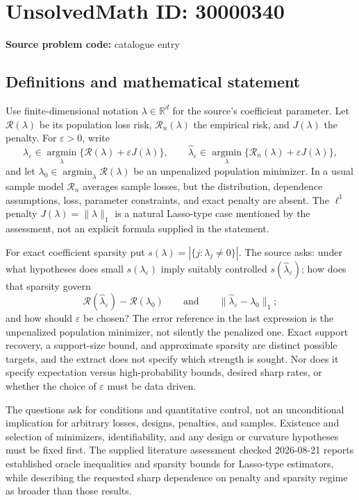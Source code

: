 \documentclass[11pt]{article}
\newcommand{\R}{\mathbb{R}}
\begin{document}
\section*{UnsolvedMath ID: 30000340}
\textbf{Source problem code:} catalogue entry
\subsection{Definitions and mathematical statement}
Use finite-dimensional notation \(\lambda\in\R^d\) for the source's coefficient parameter. Let \(\mathcal R(\lambda)\) be its population loss risk, \(\mathcal R_n(\lambda)\) the empirical risk, and \(J(\lambda)\) the penalty. For \(\varepsilon>0\), write
\[
\lambda_\varepsilon\in\operatorname*{argmin}_{\lambda}
\{\mathcal R(\lambda)+\varepsilon J(\lambda)\},\qquad
\widehat\lambda_\varepsilon\in\operatorname*{argmin}_{\lambda}
\{\mathcal R_n(\lambda)+\varepsilon J(\lambda)\},
\]
and let \(\lambda_0\in\operatorname*{argmin}_\lambda\mathcal R(\lambda)\) be an unpenalized population minimizer. In a usual sample model \(\mathcal R_n\) averages sample losses, but the distribution, dependence assumptions, loss, parameter constraints, and exact penalty are absent. The \(\ell^1\) penalty \(J(\lambda)=\|\lambda\|_1\) is a natural Lasso-type case mentioned by the assessment, not an explicit formula supplied in the statement.

For exact coefficient sparsity put \(s(\lambda)=|\{j:\lambda_j\ne0\}|\). The source asks: under what hypotheses does small \(s(\lambda_\varepsilon)\) imply suitably controlled \(s(\widehat\lambda_\varepsilon)\); how does that sparsity govern
\[
\mathcal R(\widehat\lambda_\varepsilon)-\mathcal R(\lambda_0)
\qquad\text{and}\qquad
\|\widehat\lambda_\varepsilon-\lambda_0\|_1;
\]
and how should \(\varepsilon\) be chosen? The error reference in the last expression is the unpenalized population minimizer, not silently the penalized one. Exact support recovery, a support-size bound, and approximate sparsity are distinct possible targets, and the extract does not specify which strength is sought. Nor does it specify expectation versus high-probability bounds, desired sharp rates, or whether the choice of \(\varepsilon\) must be data driven.

The questions ask for conditions and quantitative control, not an unconditional implication for arbitrary losses, designs, penalties, and samples. Existence and selection of minimizers, identifiability, and any design or curvature hypotheses must be fixed first. The supplied literature assessment checked 2026-08-21 reports established oracle inequalities and sparsity bounds for Lasso-type estimators, while describing the requested sharp dependence on penalty and sparsity regime as broader than those results.
\end{document}
